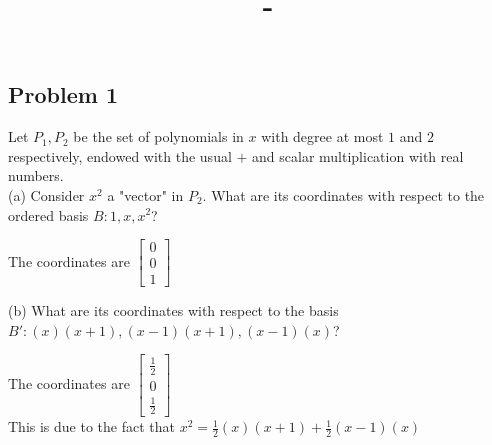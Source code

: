 \documentclass[answers,12pt,addpoints]{exam}
\author{\name}
\title{\course \ - \assignment}
\begin{document}
\maketitle

\subsection*{Problem 1}
Let $P_1,P_2$ be the set of polynomials in $x$ with degree at most $1$ and $2$ respectively, endowed with the usual $+$ and scalar multiplication with real numbers.\\

(a) Consider $x^2$ a "vector" in $P_2$. What are its coordinates with respect to the ordered basis $B:1,x,x^2$?
\begin{solution}
    The coordinates are $\begin{bmatrix} 0 \\ 0 \\ 1 \end{bmatrix}$
\end{solution}
(b) What are its coordinates with respect to the basis $B':(x)(x+1),(x-1)(x+1),(x-1)(x)$?
\begin{solution}
    The coordinates are $\begin{bmatrix} \frac{1}{2} \\ 0 \\ \frac{1}{2} \end{bmatrix}$ \\
    This is due to the fact that $x^2=\frac{1}{2}(x)(x+1)+\frac{1}{2}(x-1)(x)$
\end{solution}
\end{document}

